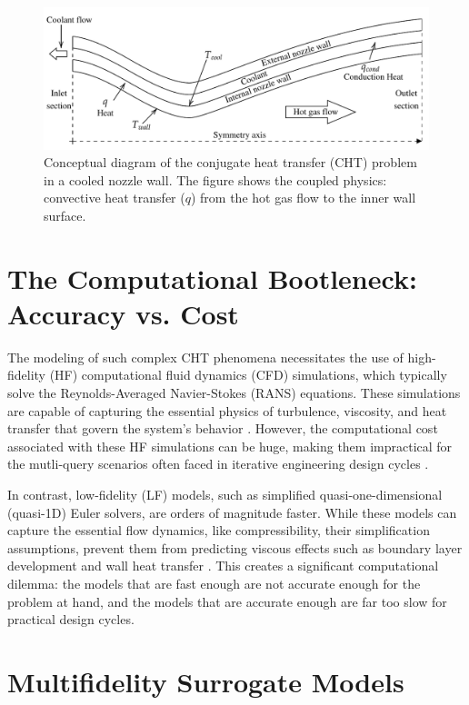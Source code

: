 \documentclass[tg, EN]{ufabcFHZh_tg}
\begin{document}
\begin{figure}[H]
    \centering
    \includegraphics[width=\textwidth]{Figuras/cd_nozzle_cht.pdf}
    \caption{Conceptual diagram of the conjugate heat transfer (CHT) problem in a cooled nozzle wall. The figure shows the coupled physics: convective heat transfer ($q$) from the hot gas flow to the inner wall surface.}
    \label{fig:cht_problem}
\end{figure}

\section{The Computational Bootleneck: Accuracy vs. Cost}

The modeling of such complex CHT phenomena necessitates the use of high-fidelity (HF) computational fluid dynamics (CFD) simulations, which typically solve the Reynolds-Averaged Navier-Stokes (RANS) equations. These simulations are capable of capturing the essential physics of turbulence, viscosity, and heat transfer that govern the system's behavior \citep{wilcox1998}. However, the computational cost associated with these HF simulations can be huge, making them impractical for the mutli-query scenarios often faced in iterative engineering design cycles \citep{hesthaven2016, benner2015, quarteroni2016,hesthaven2016}.

In contrast, low-fidelity (LF) models, such as simplified quasi-one-dimensional (quasi-1D) Euler solvers, are orders of magnitude faster. While these models can capture the essential flow dynamics, like compressibility, their simplification assumptions, prevent them from predicting viscous effects such as boundary layer development and wall heat transfer \citep{moreira2023}. This creates a significant computational dilemma: the models that are fast enough are not accurate enough for the problem at hand, and the models that are accurate enough are far too slow for practical design cycles.

\section{Multifidelity Surrogate Models}
\end{document}
